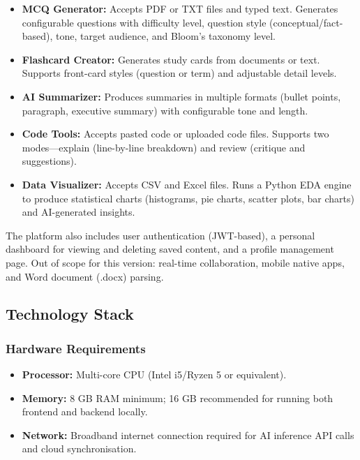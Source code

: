 \documentclass[12pt,a4paper]{article}
\begin{document}
\begin{itemize}
    \item \textbf{MCQ Generator:} Accepts PDF or TXT files and typed text. Generates configurable questions with difficulty level, question style (conceptual/fact-based), tone, target audience, and Bloom's taxonomy level.
    \item \textbf{Flashcard Creator:} Generates study cards from documents or text. Supports front-card styles (question or term) and adjustable detail levels.
    \item \textbf{AI Summarizer:} Produces summaries in multiple formats (bullet points, paragraph, executive summary) with configurable tone and length.
    \item \textbf{Code Tools:} Accepts pasted code or uploaded code files. Supports two modes—explain (line-by-line breakdown) and review (critique and suggestions).
    \item \textbf{Data Visualizer:} Accepts CSV and Excel files. Runs a Python EDA engine to produce statistical charts (histograms, pie charts, scatter plots, bar charts) and AI-generated insights.
\end{itemize}

The platform also includes user authentication (JWT-based), a personal dashboard for viewing and deleting saved content, and a profile management page. Out of scope for this version: real-time collaboration, mobile native apps, and Word document (.docx) parsing.

\subsection{Technology Stack}

\subsubsection{Hardware Requirements}
\begin{itemize}
  \item \textbf{Processor:} Multi-core CPU (Intel i5/Ryzen 5 or equivalent).
  \item \textbf{Memory:} 8 GB RAM minimum; 16 GB recommended for running both frontend and backend locally.
  \item \textbf{Network:} Broadband internet connection required for AI inference API calls and cloud synchronisation.
\end{itemize}
\end{document}
